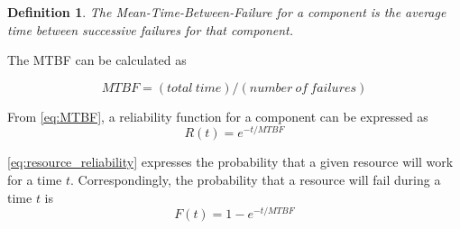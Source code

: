 \documentclass{cslthse-msc}
\newtheorem{definition}{Definition}[chapter]
\begin{document}
\begin{definition} \label{def:mtbf}
The Mean-Time-Between-Failure for a component is the average time between successive failures for that component.
\end{definition}

The MTBF can be calculated as

\begin{equation} \label{eq:MTBF}
MTBF = (total\ time) / (number\ of\ failures)
\end{equation}

From \autoref{eq:MTBF}, a reliability function for a component can be expressed as 
\begin{equation} \label{eq:resource_reliability}
R(t) = e^{-t/MTBF}
\end{equation}

\autoref{eq:resource_reliability} expresses the probability that a given resource will work for a time $t$. Correspondingly, the probability that a resource will fail during a time $t$ is
\begin{equation} \label{eq:resource_failure_prob}
F(t) = 1- e^{-t/MTBF}
\end{equation}
\end{document}
